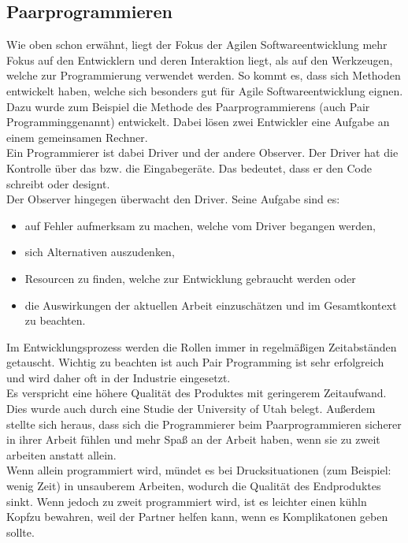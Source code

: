 \documentclass[a4paper, 10pt]{scrartcl}
\begin{document}
\subsection{Paarprogrammieren} \label{Paar}
Wie oben schon erwähnt, liegt der Fokus der Agilen Softwareentwicklung mehr Fokus auf den Entwicklern und deren Interaktion liegt, als auf den Werkzeugen, welche zur Programmierung verwendet werden. So kommt es, dass sich Methoden entwickelt haben, welche sich besonders gut für Agile Softwareentwicklung eignen.\\
Dazu wurde zum Beispiel die Methode des Paarprogrammierens (auch \glqq Pair Programming\grqq genannt) entwickelt. Dabei lösen zwei Entwickler eine Aufgabe an einem gemeinsamen Rechner.\\ 
Ein Programmierer ist dabei \glqq Driver\grqq{} und der andere \glqq Observer\grqq.
Der Driver hat die Kontrolle über das bzw. die Eingabegeräte. Das bedeutet, dass er den Code schreibt oder designt.\\
Der Observer hingegen \glqq überwacht\grqq{} den Driver. Seine Aufgabe sind es:
\begin{itemize}
\item auf Fehler aufmerksam zu machen, welche vom Driver begangen werden,
\item sich Alternativen auszudenken,
\item Resourcen zu finden, welche zur Entwicklung gebraucht werden oder
\item die Auswirkungen der aktuellen Arbeit einzuschätzen und im Gesamtkontext zu beachten.
\end{itemize}
Im Entwicklungsprozess werden die Rollen immer in regelmäßigen Zeitabständen getauscht. Wichtig zu beachten ist auch
Pair Programming ist sehr erfolgreich und wird daher oft in der Industrie eingesetzt.\\
Es verspricht eine höhere Qualität des Produktes mit geringerem Zeitaufwand. Dies wurde auch durch eine Studie der University of Utah belegt. Außerdem stellte sich heraus, dass sich die Programmierer beim Paarprogrammieren sicherer in ihrer Arbeit fühlen und mehr Spaß an der Arbeit haben, wenn sie zu zweit arbeiten anstatt allein.\\
Wenn allein programmiert wird, mündet es bei Drucksituationen (zum Beispiel: wenig Zeit) in unsauberem Arbeiten, wodurch die Qualität des Endproduktes sinkt. Wenn jedoch zu zweit programmiert wird, ist es leichter einen \glqq kühln Kopf\grqq zu bewahren, weil der Partner helfen kann, wenn es Komplikatonen geben sollte. \citep{pairprogramming}
\end{document}

